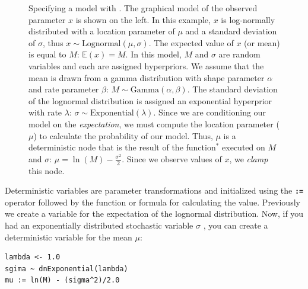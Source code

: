 \documentclass[11pt]{article}
\newcommand{\cl}[1]{{\texttt{\textbf{#1}}}}
\begin{document}
\begin{figure}[h!]
\centering
{}
\caption{\small Specifying a model with \Rev. 
The graphical model of the observed parameter $x$ is shown on the left. 
In this example, $x$ is log-normally distributed with a location parameter of $\mu$ and a standard deviation of $\sigma$, thus $x \sim \mbox{Lognormal}(\mu, \sigma)$. 
The expected value of $x$ (or mean) is equal to $M$: $\mathbb{E}(x) = M$. 
In this model, $M$ and $\sigma$ are random variables and each are assigned hyperpriors. 
We assume that the mean is drawn from a gamma distribution with shape parameter $\alpha$ and rate parameter $\beta$: $M \sim \mbox{Gamma}(\alpha, \beta)$. 
The standard deviation of the lognormal distribution is assigned an exponential hyperprior with rate $\lambda$: $\sigma \sim \mbox{Exponential}(\lambda)$. 
Since we are conditioning our model on the \emph{expectation}, we must compute the location parameter ($\mu$) to 
calculate the probability of our model. 
Thus, $\mu$ is a deterministic node that is the result of the function$^*$ executed on $M$ and $\sigma$: $\mu = \ln(M) - \frac{\sigma^2}{2}$. 
Since we observe values of $x$, we \emph{clamp} this node.
}
\label{revgmexample}
\end{figure}

Deterministic variables are parameter transformations and initialized using the \cl{:=} operator followed by the function or formula for calculating the value. 
Previously we create a variable for the expectation of the lognormal distribution.
Now, if you had an exponentially distributed stochastic variable $\sigma$ , you can create a deterministic variable for the mean $\mu$:
{\tt \begin{snugshade*}
\begin{lstlisting}
lambda <- 1.0
sgima ~ dnExponential(lambda)
mu := ln(M) - (sigma^2)/2.0
\end{lstlisting}
\end{snugshade*}}
\end{document}
